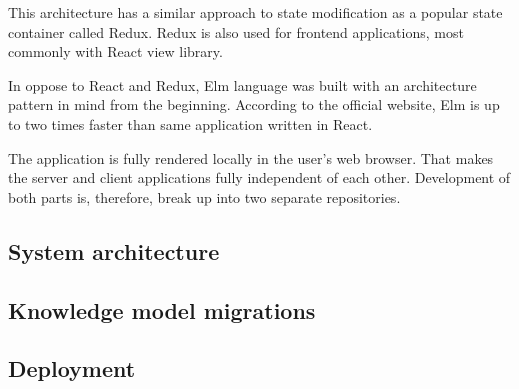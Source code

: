 This architecture has a similar approach to state modification as a popular state container called Redux.
Redux is also used for frontend applications, most commonly with React view library.

In oppose to React and Redux, Elm language was built with an architecture pattern in mind from the beginning.
According to the official website\cite{elm-speed}, Elm is up to two times faster than same application written in React.

The application is fully rendered locally in the user's web browser.
That makes the server and client applications fully independent of each other.
Development of both parts is, therefore, break up into two separate repositories.

\subsection{System architecture}

\subsection{Knowledge model migrations}

\subsection{Deployment}
